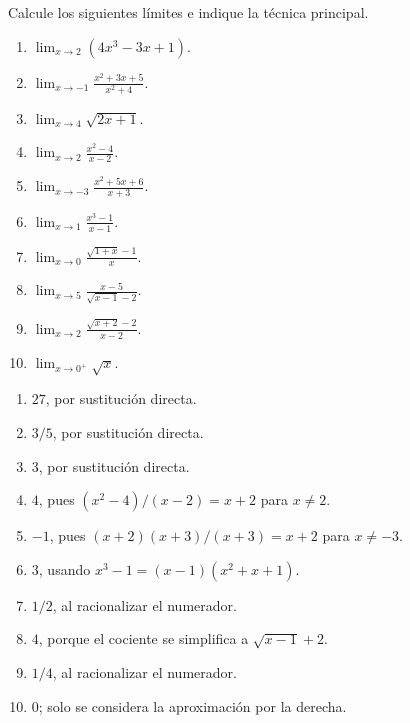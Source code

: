 \begin{ejercicios}
Calcule los siguientes límites e indique la técnica principal.
\begin{enumerate}
  \item $\displaystyle\lim_{x\to2}(4x^3-3x+1)$.
  \item $\displaystyle\lim_{x\to-1}\frac{x^2+3x+5}{x^2+4}$.
  \item $\displaystyle\lim_{x\to4}\sqrt{2x+1}$.
  \item $\displaystyle\lim_{x\to2}\frac{x^2-4}{x-2}$.
  \item $\displaystyle\lim_{x\to-3}\frac{x^2+5x+6}{x+3}$.
  \item $\displaystyle\lim_{x\to1}\frac{x^3-1}{x-1}$.
  \item $\displaystyle\lim_{x\to0}\frac{\sqrt{1+x}-1}{x}$.
  \item $\displaystyle\lim_{x\to5}\frac{x-5}{\sqrt{x-1}-2}$.
  \item $\displaystyle\lim_{x\to2}\frac{\sqrt{x+2}-2}{x-2}$.
  \item $\displaystyle\lim_{x\to0^+}\sqrt{x}$.
\end{enumerate}
\end{ejercicios}

\ifmostrarSoluciones
\begin{solucion}
\begin{enumerate}
  \item $27$, por sustitución directa.
  \item $3/5$, por sustitución directa.
  \item $3$, por sustitución directa.
  \item $4$, pues $(x^2-4)/(x-2)=x+2$ para $x\neq2$.
  \item $-1$, pues $(x+2)(x+3)/(x+3)=x+2$ para $x\neq-3$.
  \item $3$, usando $x^3-1=(x-1)(x^2+x+1)$.
  \item $1/2$, al racionalizar el numerador.
  \item $4$, porque el cociente se simplifica a $\sqrt{x-1}+2$.
  \item $1/4$, al racionalizar el numerador.
  \item $0$; solo se considera la aproximación por la derecha.
\end{enumerate}
\end{solucion}
\fi

\ifdefined\documentoSemanal
\else
{}

\fi
